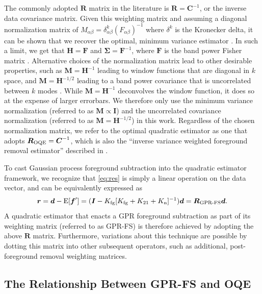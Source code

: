 \documentclass[a4paper,fleqn,usenatbib]{mnras}
\def\d{\boldsymbol{d}}
\def\f{\boldsymbol{f}}
\def\F{\boldsymbol{F}}
\def\H{\boldsymbol{H}}
\def\r{\boldsymbol{r}}
\def\R{\boldsymbol{R}}
\def\M{\boldsymbol{M}}
\def\C{\boldsymbol{C}}
\def\I{\boldsymbol{I}}
\def\Exp{{\rm E}}
\def\Kto{K_{\rm 21}}
\def\Kfg{K_{\rm fg}}
\def\Kn{K_{\rm n}}
\begin{document}
The commonly adopted $\R$ matrix in the literature is $\R = \C^{-1}$, or the inverse data covariance matrix.
Given this weighting matrix and assuming a diagonal normalization matrix of $M_{\alpha\beta} = \delta^k_{\alpha\beta}\left(F_{\alpha\beta}\right)^{-1}$ where $\delta^k$ is the Kronecker delta, it can be shown that we recover the optimal, minimum variance estimator \citep{Tegmark1997}.
In such a limit, we get that $\H = \F$ and $\boldsymbol{\Sigma} = \F^{-1}$, where $\F$ is the band power Fisher matrix \citep{Hamilton1997a, Tegmark1997, Bond2000}.
Alternative choices of the normalization matrix lead to other desirable properties, such as $\M=\H^{-1}$ leading to window functions that are diagonal in $k$ space, and $\M=\H^{-1/2}$ leading to a band power covariance that is uncorrelated between $k$ modes \citep{Tegmark2002}.
While $\M=\H^{-1}$ deconvolves the window function, it does so at the expense of larger errorbars.
We therefore only use the minimum variance normalization (referred to as $\M\propto\I$) and the uncorrelated covariance normalization (referred to as $\M=\H^{-1/2}$) in this work.
Regardless of the chosen normalization matrix, we refer to the optimal quadratic estimator as one that adopts $\R_{\rm OQE} = \C^{-1}$, which is also the ``inverse variance weighted foreground removal estimator'' described in \citet{Liu2011}.

To cast Gaussian process foreground subtraction into the quadratic estimator framework, we recognize that \autoref{eq:res} is simply a linear operation on the data vector, and can be equivalently expressed as
\begin{align}
\label{eq:gprfs}
\r = \d - \Exp[\f^\prime] = (\I - \Kfg[\Kfg + \Kto + \Kn]^{-1})\d  = \R_{\operatorname{GPR-FS}}\d.
\end{align}
A quadratic estimator that enacts a GPR foreground subtraction as part of its weighting matrix (referred to as GPR-FS) is therefore achieved by adopting the above $\R$ matrix.
Furthermore, variations about this technique are possible by dotting this matrix into other subsequent operators, such as additional, post-foreground removal weighting matrices.

\subsection{The Relationship Between GPR-FS and OQE}
\label{sec:gpr_oqe}
\end{document}
